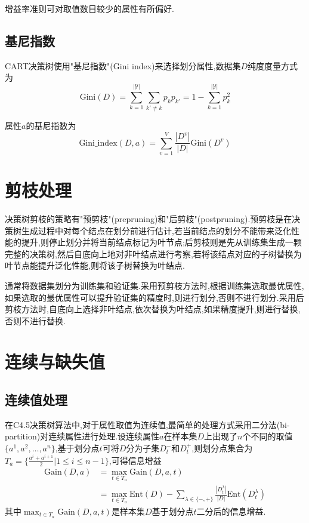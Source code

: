 增益率准则可对取值数目较少的属性有所偏好.

\subsection{基尼指数}

CART决策树使用"基尼指数"(Gini index)来选择划分属性,数据集$D$纯度度量方式为
\begin{equation}
\text{Gini}(D)=\sum_{k=1}^{|\mathcal Y|}\sum_{k'\ne k}p_kp_{k'}=1-\sum_{k=1}^{|\mathcal Y|}p_k^2
\end{equation}

属性$a$的基尼指数为
\begin{equation}
\text{Gini\_index}(D,a)=\sum_{v=1}^V\frac{|D^v|}{|D|}\text{Gini}(D^v)
\end{equation}

\section{剪枝处理}

决策树剪枝的策略有"预剪枝"(prepruning)和"后剪枝"(postpruning).预剪枝是在决策树生成过程中对每个结点在划分前进行估计,若当前结点的划分不能带来泛化性能的提升,则停止划分并将当前结点标记为叶节点;后剪枝则是先从训练集生成一颗完整的决策树,然后自底向上地对非叶结点进行考察,若将该结点对应的子树替换为叶节点能提升泛化性能,则将该子树替换为叶结点.

通常将数据集划分为训练集和验证集.采用预剪枝方法时,根据训练集选取最优属性,如果选取的最优属性可以提升验证集的精度时,则进行划分,否则不进行划分.采用后剪枝方法时,自底向上选择非叶结点,依次替换为叶结点,如果精度提升,则进行替换,否则不进行替换.

\section{连续与缺失值}

\subsection{连续值处理}

在C4.5决策树算法中,对于属性取值为连续值,最简单的处理方式采用二分法(bi-partition)对连续属性进行处理.设连续属性$a$在样本集$D$上出现了$n$个不同的取值$\{a^1,a^2,\dots,a^n\}$,基于划分点$t$可将$D$分为子集$D_t^-$和$D_t^+$,则划分点集合为$T_a=\{\frac{a^i+a^{i+1}}{2}|1\le i\le n-1\}$,可得信息增益
\begin{equation}\begin{split}
\text{Gain}(D,a)&=\max_{t\in T_a}\text{Gain}(D,a,t)\\
&=\max_{t\in T_a}\text{Ent}(D)-\sum_{\lambda\in\{-,+\}}\frac{|D_t^\lambda|}{|D|}\text{Ent}(D_t^\lambda)
\end{split}\end{equation}
其中$\max_{t\in T_a}\text{Gain}(D,a,t)$是样本集$D$基于划分点$t$二分后的信息增益.

